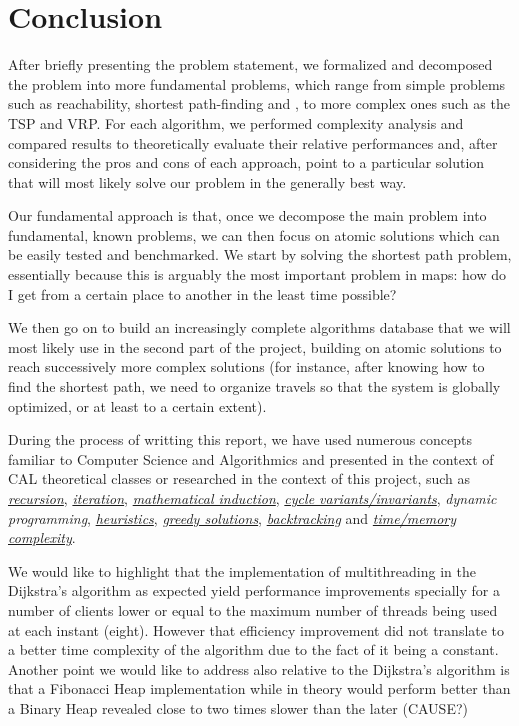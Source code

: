 \chapter{Conclusion} \label{conclusion}
After briefly presenting the problem statement, we formalized and decomposed the problem into more fundamental problems, which range from simple problems such as reachability, shortest path-finding and , to more complex ones such as the \acrshort{TSP} and \acrshort{VRP}. For each algorithm, we performed complexity analysis and compared results to theoretically evaluate their relative performances and, after considering the pros and cons of each approach, point to a particular solution that will most likely solve our problem in the generally best way.\par
Our fundamental approach is that, once we decompose the main problem into fundamental, known problems, we can then focus on atomic solutions which can be easily tested and benchmarked. We start by solving the shortest path problem, essentially because this is arguably the most important problem in maps: how do I get from a certain place to another in the least time possible?\par
We then go on to build an increasingly complete algorithms database that we will most likely use in the second part of the project, building on atomic solutions to reach successively more complex solutions (for instance, after knowing how to find the shortest path, we need to organize travels so that the system is globally optimized, or at least to a certain extent).\par
During the process of writting this report, we have used numerous concepts familiar to Computer Science and Algorithmics and presented in the context of CAL theoretical classes or researched in the context of this project, such as \emph{\hyperref[glsentry-recursive]{recursion}}, \emph{\hyperref[glsentry-iterative]{iteration}}, \emph{\hyperref[teor:dfs]{mathematical induction}}, \emph{\hyperref[sec:dijkstra-PoC]{cycle variants/invariants}}, \emph{\gls{dynamic programming}}, \emph{\hyperref[glsentry-heuristic]{heuristics}}, \emph{\hyperref[glsentry-greedy]{greedy solutions}}, \emph{\hyperref[algorithm-reachability-dfs]{backtracking}} and \emph{\hyperref[complexity-analysis]{time/memory complexity}}.\par

We would like to highlight that the implementation of multithreading in the Dijkstra's algorithm as expected yield performance improvements specially for a number of clients lower or equal to the maximum number of threads being used at each instant (eight). However that efficiency improvement did not translate to a better time complexity of the algorithm due to the fact of it being a constant.
Another point we would like to address also relative to the Dijkstra's algorithm is that a Fibonacci Heap implementation while in theory would perform better than a Binary Heap revealed close to two times slower than the later (CAUSE?)

